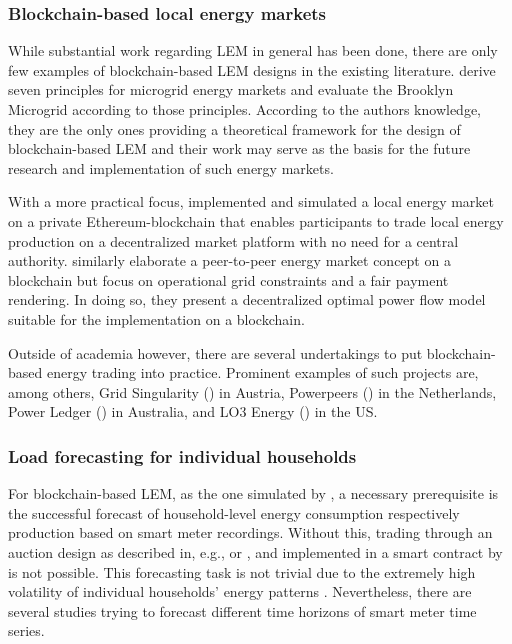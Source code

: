 \subsubsection{Blockchain-based local energy markets}

While substantial work regarding LEM in general has been done, there are only few examples of blockchain-based LEM designs in the existing literature. \citet{Mengelkamp:2018b} derive seven principles for microgrid energy markets and evaluate the Brooklyn Microgrid according to those principles. According to the authors knowledge, they are the only ones providing a theoretical framework for the design of blockchain-based LEM and their work may serve as the basis for the future research and implementation of such energy markets.

With a more practical focus, \citet{Mengelkamp:2018a} implemented and simulated a local energy market on a private Ethereum-blockchain that enables participants to trade local energy production on a decentralized market platform with no need for a central authority. \citet{Münsing:2017} similarly elaborate a peer-to-peer energy market concept on a blockchain but focus on operational grid constraints and a fair payment rendering. In doing so, they present a decentralized optimal power flow model suitable for the implementation on a blockchain.

Outside of academia however, there are several undertakings to put blockchain-based energy trading into practice. Prominent examples of such projects are, among others, Grid Singularity () in Austria, Powerpeers () in the Netherlands, Power Ledger () in Australia, and LO3 Energy () in the US.



\newpage
\subsubsection{Load forecasting for individual households}


For blockchain-based LEM, as the one simulated by \citet{Mengelkamp:2018a}, a necessary prerequisite is the successful forecast of household-level energy consumption respectively production based on smart meter recordings. Without this, trading through an auction design as described in, e.g., \citet{Block:2008} or \citet{Buchmann:2013}, and implemented in a smart contract by \citet{Mengelkamp:2018a} is not possible. This forecasting task is not trivial due to the extremely high volatility of individual households' energy patterns \citep{Wang:2018}. Nevertheless, there are several studies trying to forecast different time horizons of smart meter time series.

